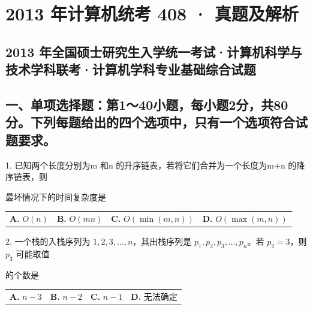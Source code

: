 \documentclass[UTF8,11pt]{ctexart}
\begin{document}
\section*{2013 年计算机统考 408 · 真题及解析}
\subsection*{2013 年全国硕士研究生入学统一考试·计算机科学与技术学科联考·计算机学科专业基础综合试题}

\subsection*{一、单项选择题：第1～40小题，每小题2分，共80分。下列每题给出的四个选项中，只有一个选项符合试题要求。}

1. 已知两个长度分别为m 和n 的升序链表，若将它们合并为一个长度为m+n 的降序链表，则


最坏情况下的时间复杂度是


\begin{center}\begin{tabular}{>{\raggedright\arraybackslash}p{\dimexpr(\linewidth-8\tabcolsep)/4\relax}>{\raggedright\arraybackslash}p{\dimexpr(\linewidth-8\tabcolsep)/4\relax}>{\raggedright\arraybackslash}p{\dimexpr(\linewidth-8\tabcolsep)/4\relax}>{\raggedright\arraybackslash}p{\dimexpr(\linewidth-8\tabcolsep)/4\relax}}
\textbf{A.} \(\displaystyle O(n)\) & \textbf{B.} \(\displaystyle O(mn)\) & \textbf{C.} \(\displaystyle O(\displaystyle \min(m,\allowbreak n))\) & \textbf{D.} \(\displaystyle O(\displaystyle \max(m,\allowbreak n))\)\\[.35em]\end{tabular}\end{center}

2. 一个栈的入栈序列为 \(\displaystyle 1,\allowbreak 2,\allowbreak 3,\allowbreak \ldots,\allowbreak n\)，其出栈序列是 \(\displaystyle p_1,\allowbreak p_2,\allowbreak p_3,\allowbreak \ldots,\allowbreak p_n\)。若 \(\displaystyle p_2=3\)，则 \(\displaystyle p_3\) 可能取值


的个数是


\begin{center}\begin{tabular}{>{\raggedright\arraybackslash}p{\dimexpr(\linewidth-8\tabcolsep)/4\relax}>{\raggedright\arraybackslash}p{\dimexpr(\linewidth-8\tabcolsep)/4\relax}>{\raggedright\arraybackslash}p{\dimexpr(\linewidth-8\tabcolsep)/4\relax}>{\raggedright\arraybackslash}p{\dimexpr(\linewidth-8\tabcolsep)/4\relax}}
\textbf{A.} \(\displaystyle n-3\) & \textbf{B.} \(\displaystyle n-2\) & \textbf{C.} \(\displaystyle n-1\) & \textbf{D.} 无法确定\\[.35em]\end{tabular}\end{center}
\end{document}
